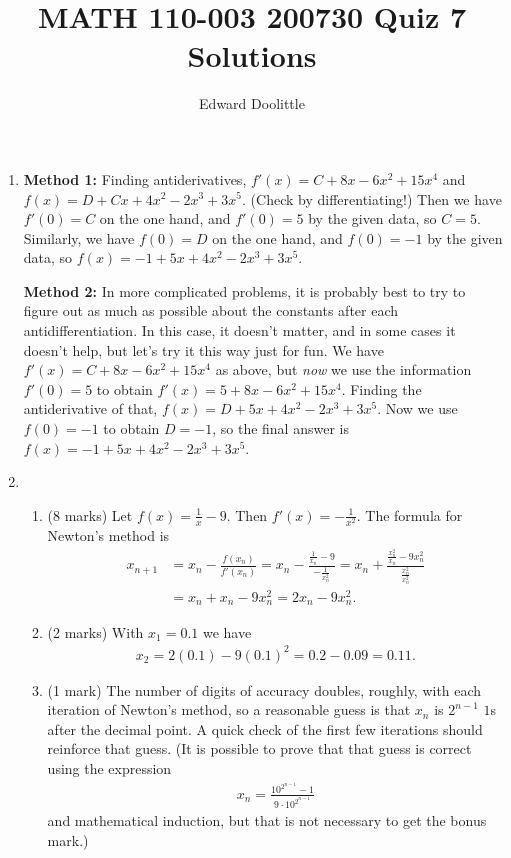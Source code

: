 \documentclass[12pt]{article}
\title{MATH 110-003 200730 Quiz 7 Solutions}
\author{Edward Doolittle}
\newcommand{\ds}{\displaystyle}
\begin{document}
\maketitle

\begin{enumerate}
\item 
  \textbf{Method 1:}  Finding antiderivatives,
  $f'(x)=C+8x-6x^2+15x^4$ and $f(x)=D+Cx+4x^2-2x^3+3x^5$.  (Check
  by differentiating!)  Then we have $f'(0)=C$ on the one hand,
  and $f'(0)=5$ by the given data, so $C=5$.  Similarly, we have
  $f(0)=D$ on the one hand, and $f(0)=-1$ by the given data, so
  $f(x)=-1+5x+4x^2-2x^3+3x^5$.
  
  \textbf{Method 2:}  In more complicated problems, it is probably
  best to try to figure out as much as possible about the constants
  after each antidifferentiation.  In this case, it doesn't matter,
  and in some cases it doesn't help, but let's try it this way just
  for fun.  We have $f'(x)=C+8x-6x^2+15x^4$ as above, but \textit{now}
  we use the information $f'(0)=5$ to obtain $f'(x)=5+8x-6x^2+15x^4$.
  Finding the antiderivative of that, $f(x)=D+5x+4x^2-2x^3+3x^5$.
  Now we use $f(0)=-1$ to obtain $D=-1$, so the final answer is
  $f(x)=-1+5x+4x^2-2x^3+3x^5$.
\item 
  \begin{enumerate}
  \item (8 marks) Let $\ds f(x)=\frac{1}{x}-9$.  
    Then $\ds f'(x)=-\frac{1}{x^2}$.
    The formula for Newton's method is
    \begin{align*}
      x_{n+1} &= x_n - \frac{f(x_n)}{f'(x_n)}
      = x_n - \frac{\ds \frac{1}{x_n}-9}{\ds -\frac{1}{x_n^2}}
      = x_n + \frac{\ds \frac{x_n^2}{x_n}-9x_n^2}{\ds \frac{x_n^2}{x_n^2}}
      \\
      &= x_n + x_n - 9x_n^2 = 2x_n-9x_n^2.
    \end{align*}
  \item (2 marks) With $x_1=0.1$ we have
    \begin{align*}
      x_2 = 2(0.1) - 9(0.1)^2 = 0.2-0.09 = 0.11.
    \end{align*}
  \item (1 mark) The number of digits of accuracy doubles, roughly,
    with each iteration of Newton's method, 
    so a reasonable guess is that $x_n$ is
    $2^{n-1}$ $1$s after the decimal point.  A quick check of the first
    few iterations should reinforce that guess.  (It is possible to prove
    that that guess is correct using the expression 
    \begin{align*}
      x_n=\frac{\ds 10^{2^{n-1}}-1}{\ds 9\cdot 10^{2^{n-1}}}
    \end{align*}
    and mathematical induction, but that is not necessary to get the 
    bonus mark.)
  \end{enumerate}
\end{enumerate}
\end{document}
